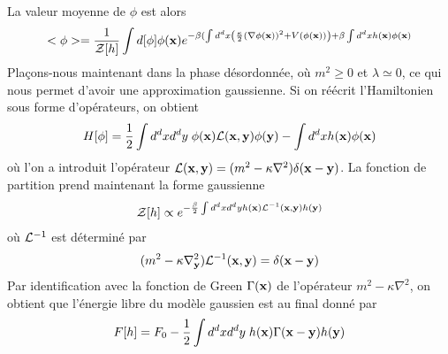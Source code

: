 La valeur moyenne de $\phi$ est alors
\begin{align}
    <\phi> =  \frac{1}{\mathcal{Z}[h]} \int d [\phi] \phi({\bf x})e^{ - \beta (\int d^d x \left( \frac{\kappa}{2} (\nabla \phi({\bf x}))^2 + V(\phi({\bf x})) \right) + \beta \int d^d x h({\bf x}) \phi({\bf x})}
\end{align}
Plaçons-nous maintenant dans la phase désordonnée, où $m^2 \ge 0$ et $\lambda \simeq 0$, ce qui nous permet d'avoir une approximation gaussienne. Si on réécrit l'Hamiltonien sous forme d'opérateurs, on obtient 
\begin{align}
    H[\phi] = \frac{1}{2} \int d^d x d^d y \; \phi({\bf x}) \mathcal{L}({\bf x},{\bf y}) \phi({\bf y}) - \int d^d x h({\bf x}) \phi({\bf x})
\end{align}
où l'on a introduit l'opérateur $\mathcal{L}({\bf x},{\bf y}) = (m^2 - \kappa \nabla^2) \delta({\bf x}-{\bf y})$.
La fonction de partition prend maintenant la forme gaussienne
\begin{align}
    \mathcal{Z}[h] \propto e^{- \frac{\beta}{2} \int d^d x d^d y h({\bf x}) \mathcal{L}^{-1}({\bf x},{\bf y}) h({\bf y})}
\end{align}
où $\mathcal{L}^{-1}$ est déterminé par 
\begin{align}
    (m^2 - \kappa \nabla_{\bf y}^2) \mathcal{L}^{-1}({\bf x},{\bf y}) = \delta({\bf x}-{\bf y})
\end{align}
Par identification avec la fonction de Green $\Gamma({\bf x})$ de l'opérateur $m^2 - \kappa \nabla^2$, on obtient que l'énergie libre du modèle gaussien est au final donné par 
\begin{align}
    F[h] = F_0 - \frac{1}{2} \int d^d x d^dy \;  h({\bf x}) \Gamma({\bf x}-{\bf y}) h({\bf y})
\end{align}


